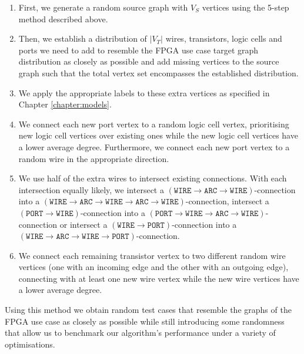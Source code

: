 \begin{enumerate}
\item First, we generate a random source graph with $V_S$ vertices using the 5-step method described above.
\item Then, we establish a distribution of $|V_T|$ wires, transistors, logic cells and ports we need to add to resemble the FPGA use case target graph distribution as closely as possible and add missing vertices to the source graph such that the total vertex set encompasses the established distribution.
\item We apply the appropriate labels to these extra vertices as specified in Chapter \ref{chapter:models}.
\item We connect each new port vertex to a random logic cell vertex, prioritising new logic cell vertices over existing ones while the new logic cell vertices have a lower average degree. Furthermore, we connect each new port vertex to a random wire in the appropriate direction.
\item We use half of the extra wires to intersect existing connections. With each intersection equally likely, we intersect a $(\mathtt{WIRE} \to \mathtt{ARC} \to \mathtt{WIRE})$-connection into a $(\mathtt{WIRE} \to \mathtt{ARC} \to \mathtt{WIRE} \to \mathtt{ARC} \to \mathtt{WIRE})$-connection, intersect a $(\mathtt{PORT} \to \mathtt{WIRE})$-connection into a $(\mathtt{PORT} \to \mathtt{WIRE} \to \mathtt{ARC} \to \mathtt{WIRE})$-connection or intersect a  $(\mathtt{WIRE} \to \mathtt{PORT})$-connection into a $(\mathtt{WIRE} \to \mathtt{ARC} \to \mathtt{WIRE} \to \mathtt{PORT})$-connection.
\item We connect each remaining transistor vertex to two different random wire vertices (one with an incoming edge and the other with an outgoing edge), connecting with at least one new wire vertex while the new wire vertices have a lower average degree.
\end{enumerate}

Using this method we obtain random test cases that resemble the graphs of the FPGA use case as closely as possible while still introducing some randomness that allow us to benchmark our algorithm's performance under a variety of optimisations.

